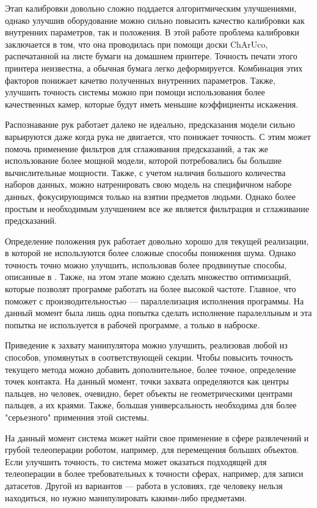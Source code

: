 \documentclass[12pt, a4paper]{article}
\begin{document}
Этап калибровки довольно сложно поддается алгоритмическим улучшениями, однако
улучшив оборудование можно сильно повысить качество калибровки как внутренних
параметров, так и положения. В этой работе проблема калибровки заключается в
том, что она проводилась при помощи доски ChArUco, распечатанной на листе
бумаги на домашнем принтере. Точность печати этого принтера неизвестна, а
обычная бумага легко деформируется. Комбинация этих факторов понижает качетво
полученных внутренних параметров. Также, улучшить точность системы можно при
помощи использования более качественных камер, которые будут иметь меньшие
коэффициенты искажения.

Распознавание рук работает далеко не идеально, предсказания модели сильно
варьируются даже когда рука не двигается, что понижает точность. С этим может
помочь применение фильтров для сглаживания предсказаний, а так же использование
более мощной модели, которой потребовались бы большие вычислительные мощности.
Также, с учетом наличия большого количества наборов данных, можно натренировать
свою модель на специфичном наборе данных, фокусирующимся только на взятии
предметов людьми. Однако более простым и необходимым улучшением все же является
фильтрация и сглаживание предсказаний.

Определение положения рук работает довольно хорошо для текущей реализации, в
которой не используются более сложные способы понижения шума. Однако точность
точно можно улучшить, использовав более продвинутые способы, описанные в
\cite{multiview_cv}. Также, на этом этапе можно сделать множество оптимизаций,
которые позволят программе работать на более высокой частоте. Главное, что
поможет с производительностью --- параллелизация исполнения программы. На
данный момент была лишь одна попытка сделать исполнение паралелльным и эта
попытка не используется в рабочей программе, а только в наброске.

Приведение к захвату манипулятора можно улучшить, реализовав любой из способов,
упомянутых в соответствующей секции. Чтобы повысить точность текущего метода
можно добавить дополнительное, более точное, определение точек контакта. На
данный момент, точки захвата определяются как центры пальцев, но человек,
очевидно, берет объекты не геометрическими центрами пальцев, а их краями. 
Также, большая универсальность необходима для более "серьезного" применния этой
системы.

На данный момент система может найти свое применение в сфере развлечений и
грубой телеоперации роботом, например, для перемещения больших объектов. Если
улучшить точность, то система может оказаться подходящей для телеоперации в
более требовательных к точности сферах, например, для записи датасетов. Другой
из вариантов --- работа в условиях, где человеку нельзя находиться,
но нужно манипулировать какими-либо предметами.
\end{document}
